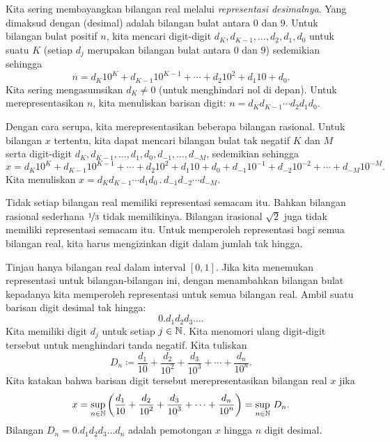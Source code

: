 
Kita sering membayangkan bilangan real melalui
\emph{representasi desimalnya}.
Yang dimaksud dengan
\emph{} (desimal) adalah bilangan bulat
antara $0$ dan $9$.
Untuk bilangan bulat positif $n$, kita mencari digit-digit $d_K,d_{K-1},\ldots,d_2,d_1,d_0$ untuk suatu
$K$ (setiap $d_j$ merupakan bilangan bulat antara $0$ dan $9$) sedemikian sehingga
\begin{equation*}
n = d_K {10}^K + d_{K-1} {10}^{K-1} + \cdots + d_2 {10}^2 + d_1 10 + d_0 .
\end{equation*}
Kita sering mengasumsikan $d_K \neq 0$ (untuk menghindari nol di depan).
Untuk merepresentasikan $n$, kita menuliskan barisan
digit: $n = d_K d_{K-1} \cdots d_2 d_1 d_0$.

Dengan cara serupa, kita
merepresentasikan beberapa bilangan rasional. Untuk bilangan
$x$ tertentu, kita dapat mencari
bilangan bulat tak negatif $K$ dan $M$ serta digit-digit
$d_K,d_{K-1},\ldots,d_1,d_0,d_{-1},\ldots,d_{-M}$, sedemikian sehingga
\begin{equation*}
x
= d_K {10}^K + d_{K-1} {10}^{K-1} + \cdots + d_2 {10}^2 + d_1 10 + d_0
+ d_{-1} {10}^{-1} + d_{-2} {10}^{-2} + \cdots + d_{-M} {10}^{-M} .
\end{equation*}
Kita menuliskan $x = d_K d_{K-1} \cdots d_1 d_0 \, . \, d_{-1} d_{-2} \cdots d_{-M}$.

Tidak setiap bilangan real memiliki representasi semacam itu.
Bahkan bilangan rasional sederhana
$\nicefrac{1}{3}$ tidak memilikinya. Bilangan irasional $\sqrt{2}$ juga
tidak memiliki representasi semacam itu. Untuk memperoleh representasi bagi
semua bilangan real, kita harus mengizinkan digit dalam jumlah tak hingga.

Tinjau hanya bilangan real dalam interval $[0,1]$. Jika
kita menemukan representasi untuk bilangan-bilangan ini, dengan menambahkan
bilangan bulat kepadanya kita memperoleh representasi untuk semua bilangan real.
Ambil suatu barisan digit desimal tak hingga:
\begin{equation*}
0.d_1d_2d_3\ldots.
\end{equation*}
Kita memiliki digit $d_j$ untuk setiap $j \in {\mathbb{N}}$.
Kita menomori ulang digit-digit tersebut untuk menghindari tanda negatif.
Kita tuliskan
\begin{equation*}
D_n \coloneqq
\frac{d_1}{10} +
\frac{d_2}{{10}^2} +
\frac{d_3}{{10}^3} +
\cdots +
\frac{d_n}{{10}^n} .
\end{equation*}
Kita katakan bahwa
barisan digit tersebut merepresentasikan bilangan real $x$ jika
\begin{equation*}
x =
\sup_{n \in {\mathbb{N}}} \left(
\frac{d_1}{10} +
\frac{d_2}{{10}^2} +
\frac{d_3}{{10}^3} +
\cdots +
\frac{d_n}{{10}^n}
\right) =
\sup_{n \in {\mathbb{N}}} \, D_n .
\end{equation*}
Bilangan $D_n=0.d_1 d_2 d_3 \ldots d_n$ adalah pemotongan $x$
hingga $n$ digit desimal.

